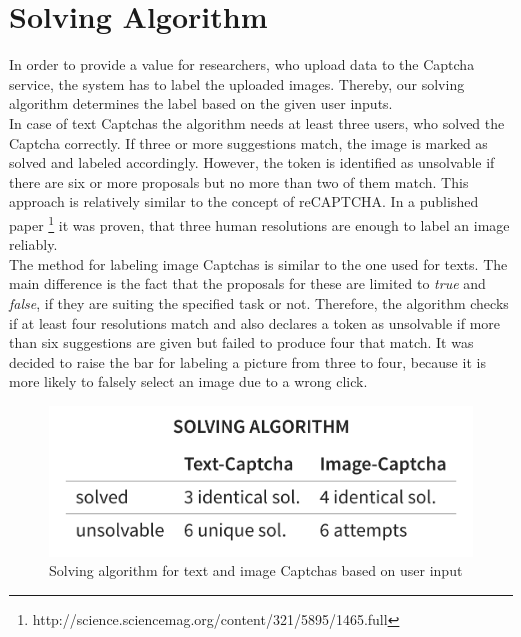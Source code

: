\section{Solving Algorithm}
\label{sec:solving_algorithm}

In order to provide a value for researchers, who upload data to the Captcha service, the system has to label the uploaded images. Thereby, our solving algorithm determines the label based on the given user inputs.\\
In case of text Captchas the algorithm needs at least three users, who solved the Captcha correctly. If three or more suggestions match, the image is marked as solved and labeled accordingly. However, the token is identified as unsolvable if there are six or more proposals but no more than two of them match. This approach is relatively similar to the concept of reCAPTCHA. In a published paper \footnote{http://science.sciencemag.org/content/321/5895/1465.full} it was proven, that three human resolutions are enough to label an image reliably.\\
The method for labeling image Captchas is similar to the one used for texts. The main difference is the fact that the proposals for these are limited to \textit{true} and \textit{false}, if they are suiting the specified task or not. Therefore, the algorithm checks if at least four resolutions match and also declares a token as unsolvable if more than six suggestions are given but failed to produce four that match. It was decided to raise the bar for labeling a picture from three to four, because it is more likely to falsely select an image due to a wrong click.
\begin{figure}[!h]
\centering
\includegraphics[width=0.8\linewidth]{content/figures/solving_algorithm.png}
\caption{Solving algorithm for text and image Captchas based on user input}
\label{fig:solving_algorithm}
\end{figure}

\clearpage
